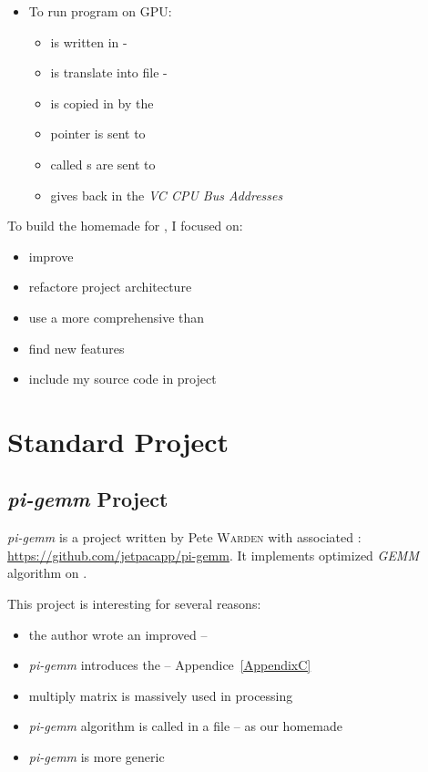 \begin{itemize}
\begin{itemize}
		\end{itemize}
	\item To run program on GPU:
		\begin{itemize}
			\item {} is written in  - 
			\item {} is translate into  file - 
			\item {} is copied in \ram{} by the \cpu
			\item {} pointer is sent to 
			\item {} called \uni{}s are sent to \qpu{}
			\item \vc{} gives back in the \emph{VC CPU Bus Addresses}
		\end{itemize}
\end{itemize}
To build the homemade \api{} for \iBubble, I focused on:
\begin{itemize}
	\item improve 
	\item refactore project architecture
	\item use a more comprehensive  than 
	\item find new \vc{} features
	\item include my source code in  project
\end{itemize}


\section{Standard Project}

\subsection{\emph{pi-gemm} Project}

\emph{pi-gemm} \parencite{refPiGemm} is a project written by Pete \textsc{Warden} with associated : \url{https://github.com/jetpacapp/pi-gemm}. It implements optimized \emph{GEMM} algorithm on \vc.

This project is interesting for several reasons:
\begin{itemize}
	\item the author wrote an improved  -- 
	\item \emph{pi-gemm} introduces the  -- Appendice~\ref{AppendixC}
	\item multiply matrix is massively used in \flow{} processing
	\item \emph{pi-gemm} algorithm is called in a  file -- as our homemade \api
	\item \emph{pi-gemm}  is more generic
\end{itemize}


